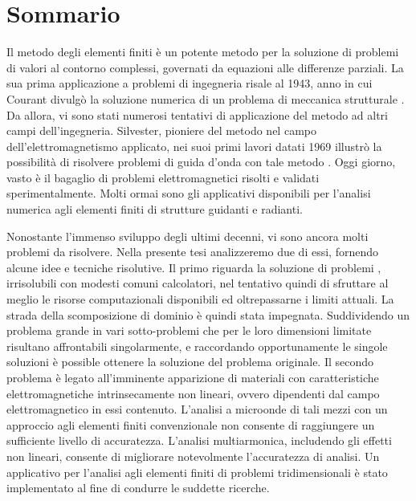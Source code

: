 \chapter*{Sommario}
Il metodo degli elementi finiti \`e un potente metodo per la soluzione di problemi  di valori al contorno complessi, governati da equazioni alle differenze parziali. La sua prima applicazione a problemi di ingegneria risale al 1943, anno in cui Courant divulg\`o la soluzione numerica di un problema di meccanica strutturale \cite{courant1943variational}. Da allora, vi sono stati numerosi tentativi di applicazione del metodo ad altri campi dell'ingegneria. Silvester, pioniere del metodo nel campo dell'elettromagnetismo applicato, nei suoi primi lavori datati 1969 %
illustr\`o la possibilit\`a di risolvere problemi di guida d'onda con tale metodo \cite{silvester1969finite, coccioli1996finite}. Oggi giorno, vasto \`e il bagaglio di problemi elettromagnetici risolti e validati sperimentalmente. Molti ormai sono gli applicativi disponibili per l'analisi numerica agli elementi finiti di strutture guidanti e radianti.

Nonostante l'immenso sviluppo degli ultimi decenni, vi sono ancora molti problemi da risolvere. Nella presente tesi analizzeremo due di essi, fornendo alcune idee e tecniche risolutive. Il primo riguarda la soluzione di problemi , irrisolubili con modesti comuni calcolatori, nel tentativo quindi di sfruttare al meglio le risorse computazionali disponibili ed oltrepassarne i limiti attuali. La strada della scomposizione di dominio \`e quindi stata impegnata. Suddividendo un  problema grande in vari sotto-problemi che per le loro dimensioni limitate risultano affrontabili singolarmente, e raccordando opportunamente le singole soluzioni \`e possible ottenere la soluzione del problema originale. Il secondo problema \`e legato all'imminente apparizione di materiali con caratteristiche elettromagnetiche intrinsecamente non lineari, ovvero dipendenti dal campo elettromagnetico in essi contenuto. L'analisi a microonde di tali mezzi con un approccio agli elementi finiti convenzionale non consente di raggiungere un sufficiente livello di accuratezza. L'analisi multiarmonica, includendo gli effetti non lineari, consente di migliorare notevolmente l'accuratezza di analisi. Un applicativo per l'analisi agli elementi finiti di problemi tridimensionali \`e stato implementato al fine di condurre le suddette ricerche.
\newpage
\thispagestyle{empty}
\cleardoublepage

